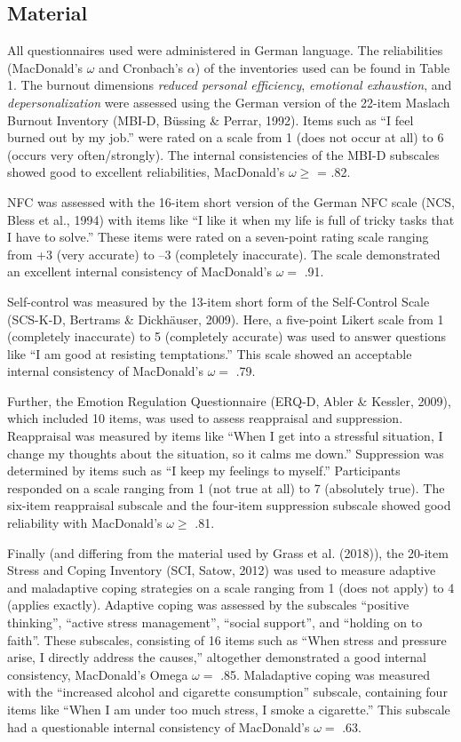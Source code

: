 \documentclass[
  man]{apa6}
\begin{document}
\subsection{Material}\label{material}

All questionnaires used were administered in German language.
The reliabilities (MacDonald's \(\omega\) and Cronbach's \(\alpha\)) of the inventories used can be found in Table 1.
The burnout dimensions \emph{reduced personal efficiency}, \emph{emotional exhaustion}, and \emph{depersonalization} were assessed using the German version of the 22-item Maslach Burnout Inventory (MBI-D, Büssing \& Perrar, 1992).
Items such as ``I feel burned out by my job.'' were rated on a scale from 1 (does not occur at all) to 6 (occurs very often/strongly).
The internal consistencies of the MBI-D subscales showed good to excellent reliabilities, MacDonald's \(\omega\ge\) = .82.

NFC was assessed with the 16-item short version of the German NFC scale (NCS, Bless et al., 1994) with items like ``I like it when my life is full of tricky tasks that I have to solve.'' These items were rated on a seven-point rating scale ranging from +3 (very accurate) to --3 (completely inaccurate).
The scale demonstrated an excellent internal consistency of MacDonald's \(\omega=\) .91.

Self-control was measured by the 13-item short form of the Self-Control Scale (SCS-K-D, Bertrams \& Dickhäuser, 2009).
Here, a five-point Likert scale from 1 (completely inaccurate) to 5 (completely accurate) was used to answer questions like ``I am good at resisting temptations.''
This scale showed an acceptable internal consistency of MacDonald's \(\omega=\) .79.

Further, the Emotion Regulation Questionnaire (ERQ-D, Abler \& Kessler, 2009), which included 10 items, was used to assess reappraisal and suppression. Reappraisal was measured by items like ``When I get into a stressful situation, I change my thoughts about the situation, so it calms me down.''
Suppression was determined by items such as ``I keep my feelings to myself.''
Participants responded on a scale ranging from 1 (not true at all) to 7 (absolutely true).
The six-item reappraisal subscale and the four-item suppression subscale showed good reliability with MacDonald's \(\omega\ge\) .81.

Finally (and differing from the material used by Grass et al. (2018)), the 20-item Stress and Coping Inventory (SCI, Satow, 2012) was used to measure adaptive and maladaptive coping strategies on a scale ranging from 1 (does not apply) to 4 (applies exactly).
Adaptive coping was assessed by the subscales ``positive thinking'', ``active stress management'', ``social support'', and ``holding on to faith''.
These subscales, consisting of 16 items such as ``When stress and pressure arise, I directly address the causes,'' altogether demonstrated a good internal consistency, MacDonald's Omega \(\omega=\) .85.
Maladaptive coping was measured with the ``increased alcohol and cigarette consumption'' subscale, containing four items like ``When I am under too much stress, I smoke a cigarette.''
This subscale had a questionable internal consistency of MacDonald's \(\omega=\) .63.
\end{document}
